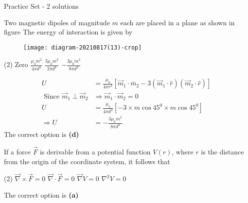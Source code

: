\newpage
\begin{abox}
	Practice Set - 2 solutions
	\end{abox}
\begin{enumerate}
	\begin{minipage}{\textwidth}
		\item Two magnetic dipoles of magnitude $m$ each are placed in a plane as shown in figure The energy of interaction is given by
		\begin{figure}[H]
			\centering
			\texttt{[image: diagram-20210817(13)-crop]}
			\caption{}
			\label{}
		\end{figure}
	\end{minipage}
	\begin{tasks}(2)
		\task[\textbf{A.}] Zero
		\task[\textbf{B.}]$\frac{\mu_{0} m^{2}}{4 \pi d^{3}}$
		\task[\textbf{C.}]$\frac{3 \mu_{0} m^{2}}{2 \pi d^{3}}$
		\task[\textbf{D.}]$-\frac{3 \mu_{0} m^{2}}{8 \pi d^{3}}$
	\end{tasks}
	\begin{answer}
		\begin{align*}
		U&=\frac{\mu_{0}}{4 \pi r^{3}}\left[\vec{m}_{1} \cdot \bar{m}_{2}-3\left(\vec{m}_{1} \cdot \hat{r}\right)\left(\vec{m}_{2} \cdot \hat{r}\right)\right] \\
		\text { Since } \vec{m}_{1} \perp \vec{m}_{2} &\Rightarrow \vec{m}_{1} \cdot \vec{m}_{2}=0\\
		 U&=\frac{\mu_{0}}{4 \pi d^{3}}\left[-3 \times m \cos 45^{0} \times m \cos 45^{0}\right] \\
		\Rightarrow U&=-\frac{3 \mu_{0} m^{2}}{8 \pi d^{3}}
		\end{align*}	
		The correct option is \textbf{(d)}
	\end{answer}
	\begin{minipage}{\textwidth}
		\item If a force $\vec{F}$ is derivable from a potential function $V(r)$, where $r$ is the distance from the origin of the coordinate system, it follows that
	\end{minipage}
	\begin{tasks}(2)
		\task[\textbf{A.}]$\vec{\nabla} \times \vec{F}=0$
		\task[\textbf{B.}]$\vec{\nabla} \cdot \vec{F}=0$
		\task[\textbf{C.}]$\vec{\nabla} V=0$
		\task[\textbf{D.}]$\nabla^{2} V=0$
	\end{tasks}
	\begin{answer}
		The correct option is \textbf{(a)}	
	\end{answer}

\end{enumerate}
